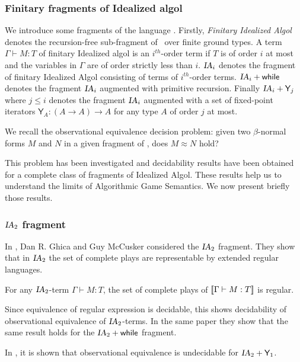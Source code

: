 \subsubsection{Finitary fragments of Idealized algol}
We introduce some fragments of the language \ialgol. Firstly,
\emph{Finitary Idealized Algol} denotes the recursion-free
sub-fragment of \ialgol\ over finite ground types. A term $\Gamma
\vdash M:T$ of finitary Idealized algol is an $i^{th}$-order term if
$T$ is of order $i$ at most and the variables in $\Gamma$ are of
order strictly less than $i$. $\textsl{IA}_i$ denotes the fragment of
finitary Idealized Algol consisting of terms of $i^{th}$-order
terms. $\textsl{IA}_i + \textsf{while}$ denotes the fragment $\textsl{IA}_i$
augmented with primitive recursion. Finally $\textsl{IA}_i +
\textsf{Y}_j$ where $j \leq i$ denotes the fragment $\textsl{IA}_i$
augmented with a set of fixed-point iterators $\textsf{Y}_A :
(A\rightarrow A ) \rightarrow A$ for any type $A$ of order $j$ at
most.

We recall the observational equivalence decision problem: given two
$\beta$-normal forms $M$ and $N$ in a given fragment of \ialgol,
does $M \approx N$ hold?

This problem has been investigated and decidability results have
been obtained for a complete class of fragments of Idealized Algol.
These results help us to understand the limits of Algorithmic Game
Semantics. We now present briefly those results.

\subsubsection{$\textsl{IA}_2$ fragment}
In \cite{ghicamccusker00}, Dan R. Ghica and Guy McCusker considered the $\textsl{IA}_2$ fragment.
They show that in $\textsl{IA}_2$ the set of complete plays are
representable by extended regular languages.

\begin{lem}
For any $\textsl{IA}_2$-term $\Gamma \vdash M : T$, the set of complete
plays of ${[\![ \Gamma \vdash M : T ]\!]}$ is regular.
\end{lem}
Since equivalence of regular expression is decidable, this shows
decidability of observational equivalence of $\textsl{IA}_2$-terms. In
the same paper they show that the same result holds for the
$\textsl{IA}_2 +\textsf{while}$ fragment.

In \cite{Ong02}, it is shown that observational equivalence is
undecidable for $\textsl{IA}_2 + \textsf{Y}_1$.


